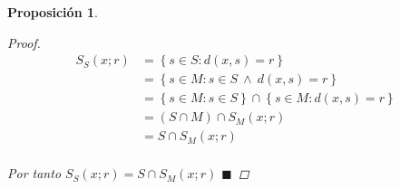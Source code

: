 \documentclass[oneside]{book} %
\theoremstyle{Teorema}
\newtheorem{Proposicion}[Definicion]{Proposición}
\theoremstyle{Ejemplos}
\theoremstyle{[Obs]}
\renewcommand{\{}{\left\lbrace} %
\renewcommand{\}}{\right\rbrace} %
\newcommand{\y}{\ \wedge\ } %
\newcommand{\n}{\cap} %
\renewcommand{\qed}{$\blacksquare$} %
\begin{document}
\begin{Proposicion}
\begin{proof}
					\begin{align*}
						S_S(x;r) & = \{ s \in S : d(x, s) = r \} \\
						& = \{ s \in M: s \in S \y d(x, s) = r \} \\ 
						& = \{ s \in M : s \in S\} \n \{ s \in M : d(x, s) = r \} \\ 
						& = (S \n M) \n S_M(x;r) \\ 
						& = S \n S_M(x;r) \\ 
					\end{align*}

					Por tanto $S_S(x;r) = S \n S_M(x;r)$ \qed

				\end{proof}

			\end{Proposicion}
\end{document}
